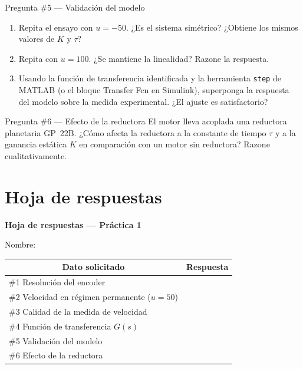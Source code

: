\documentclass[12pt,a4paper]{article}
\begin{document}
\begin{pregunta}{Pregunta \#5 — Validación del modelo}
  \begin{enumerate}[label=\alph*)]
    \item Repita el ensayo con $u=-50$. ¿Es el sistema simétrico?
          ¿Obtiene los mismos valores de $K$ y $\tau$?
    \item Repita con $u=100$. ¿Se mantiene la linealidad? Razone la respuesta.
    \item Usando la función de transferencia identificada y la herramienta
          \texttt{step} de MATLAB (o el bloque Transfer Fcn en Simulink),
          superponga la respuesta del modelo sobre la medida experimental.
          ¿El ajuste es satisfactorio?
  \end{enumerate}
\end{pregunta}

\begin{pregunta}{Pregunta \#6 — Efecto de la reductora}
  El motor lleva acoplada una reductora planetaria GP~22B. ¿Cómo afecta
  la reductora a la constante de tiempo $\tau$ y a la ganancia estática $K$
  en comparación con un motor sin reductora? Razone cualitativamente.
\end{pregunta}

\section*{Hoja de respuestas}

\begin{center}
{\large\bfseries Hoja de respuestas — Práctica 1}
\end{center}

Nombre: \underline{\hspace{8cm}}

\vspace{6pt}

\begin{tabular}{|p{5.5cm}|p{8.5cm}|}
\hline
\multicolumn{1}{|c|}{\textbf{Dato solicitado}} &
\multicolumn{1}{c|}{\textbf{Respuesta}} \\
\hline
\#1 Resolución del encoder &
\vspace{2.5cm} \\
\hline
\#2 Velocidad en régimen permanente ($u=50$) &
\vspace{2.5cm} \\
\hline
\#3 Calidad de la medida de velocidad &
\vspace{2.5cm} \\
\hline
\#4 Función de transferencia $G(s)$ &
\vspace{2.5cm} \\
\hline
\#5 Validación del modelo &
\vspace{2.5cm} \\
\hline
\#6 Efecto de la reductora &
\vspace{2.5cm} \\
\hline
\end{tabular}
\end{document}
